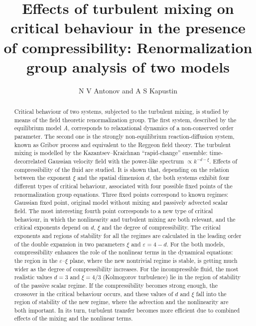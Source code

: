 \documentclass[12pt]{article}
\begin{document}
\title[Effects of turbulent mixing on critical behaviour in the presence
of compressibility] {Effects of turbulent mixing on critical
behaviour in the presence of compressibility: Renormalization
group analysis of two models}

\author{ N V Antonov and A S Kapustin}

\address{Department of Theoretical Physics, St.~Petersburg State University
\\ Uljanovskaja 1, St.~Petersburg, Petrodvorez, 198504 Russia}


\begin{abstract}
Critical behaviour of two systems, subjected to the turbulent
mixing, is studied by means of the field theoretic renormalization
group. The first system, described by the equilibrium model {\it
A}, corresponds to relaxational dynamics of a non-conserved order
parameter. The second one is the strongly non-equilibrium
reaction-diffusion system, known as Gribov process and equivalent
to the Reggeon field theory. The turbulent mixing is modelled by
the Kazantsev--Kraichnan ``rapid-change'' ensemble:
time-decorrelated Gaussian velocity field with the power-like
spectrum $\propto k^{-d-\xi}$. Effects of compressibility of the
fluid are studied. It is shown that, depending on the relation
between the exponent $\xi$ and the spatial dimension $d$, the both
systems exhibit four different types of critical behaviour,
associated with four possible fixed points of the renormalization
group equations. Three fixed points correspond to known regimes:
Gaussian fixed point, original model without mixing and passively
advected scalar field. The most interesting fourth point
corresponds to a new type of critical behaviour, in which the
nonlinearity and turbulent mixing are both relevant, and the
critical exponents depend on $d$, $\xi$ and the degree of
compressibility. The critical exponents and regions of stability
for all the regimes are calculated in the leading order of the
double expansion in two parameters $\xi$ and $\varepsilon=4-d$.
For the both models, compressibility enhances the role of the
nonlinear terms in the dynamical equations: the region in the
$\varepsilon$--$\xi$ plane, where the new nontrivial regime is
stable, is getting much wider as the degree of compressibility
increases. For the incompressible fluid, the most realistic values
$d=3$ and $\xi=4/3$ (Kolmogorov turbulence) lie in the region of
stability of the passive scalar regime. If the compressibility
becomes strong enough, the crossover in the critical behaviour
occurs, and these values of $d$ and $\xi$ fall into the region of
stability of the new regime, where the advection and the
nonlinearity are both important. In its turn, turbulent transfer
becomes more efficient due to combined effects of the mixing and
the nonlinear terms.
\end{abstract}
\end{document}
